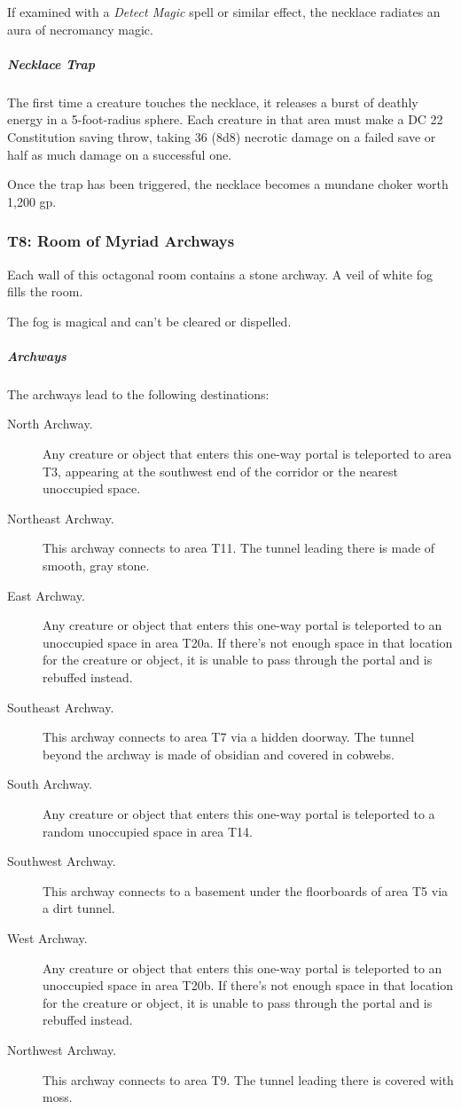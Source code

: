 \documentclass[10pt,a4paper,twoside,bg=print,twocolumn,openany,nodeprecatedcode]{dndbook}
\begin{document}
If examined with a \textit{Detect Magic} spell or similar effect, the necklace radiates an aura of necromancy magic.

\subparagraph{Necklace Trap}
The first time a creature touches the necklace, it releases a burst of deathly energy in a 5-foot-radius sphere. Each creature in that area must make a DC 22 Constitution saving throw, taking 36 (8d8) necrotic damage on a failed save or half as much damage on a successful one.

Once the trap has been triggered, the necklace becomes a mundane choker worth 1,200 gp.

\subsubsection{T8: Room of Myriad Archways}
\begin{DndReadAloud}{}
Each wall of this octagonal room contains a stone archway. A veil of white fog fills the room.

\end{DndReadAloud}

The fog is magical and can't be cleared or dispelled.

\subparagraph{Archways}
The archways lead to the following destinations:


\begin{description}
\item[North Archway.]
Any creature or object that enters this one-way portal is teleported to area T3, appearing at the southwest end of the corridor or the nearest unoccupied space.
\item[Northeast Archway.]
This archway connects to area T11. The tunnel leading there is made of smooth, gray stone.
\item[East Archway.]
Any creature or object that enters this one-way portal is teleported to an unoccupied space in area T20a. If there's not enough space in that location for the creature or object, it is unable to pass through the portal and is rebuffed instead.
\item[Southeast Archway.]
This archway connects to area T7 via a hidden doorway. The tunnel beyond the archway is made of obsidian and covered in cobwebs.
\item[South Archway.]
Any creature or object that enters this one-way portal is teleported to a random unoccupied space in area T14.
\item[Southwest Archway.]
This archway connects to a basement under the floorboards of area T5 via a dirt tunnel.
\item[West Archway.]
Any creature or object that enters this one-way portal is teleported to an unoccupied space in area T20b. If there's not enough space in that location for the creature or object, it is unable to pass through the portal and is rebuffed instead.
\item[Northwest Archway.]
This archway connects to area T9. The tunnel leading there is covered with moss.
\end{description}
\end{document}
